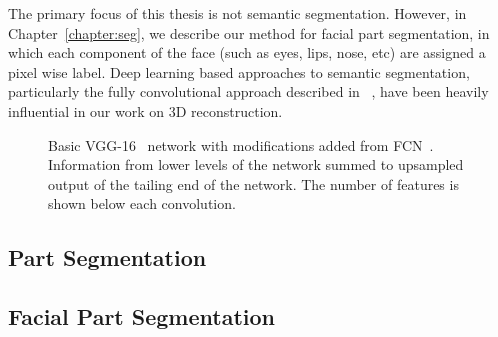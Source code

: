 The primary focus of this thesis is not semantic
segmentation. However, in Chapter~\ref{chapter:seg}, we describe our
method for facial part segmentation, in which each component of the
face (such as eyes, lips, nose, etc) are assigned a pixel wise
label. Deep learning based approaches to semantic segmentation,
particularly the fully convolutional approach described in
~\cite{long2015fully}, have been heavily influential in our work on 3D
reconstruction.

\begin{figure}
  \centering
\caption[The VGG-16 network]{Basic VGG-16~\cite{simonyan2014vgg}
  network with modifications added from
  FCN~\cite{long2015fully}. Information from lower levels of the
  network summed to upsampled output of the tailing end of the
  network. The number of features is shown below each convolution.}
\label{fig:background:fcn}
\end{figure}

\subsection{Part Segmentation}

\subsection{Facial Part Segmentation}












